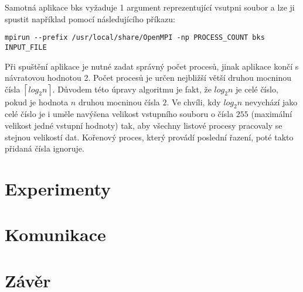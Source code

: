 \documentclass[11pt,a4paper,titlepage]{article}
\begin{document}
        Samotná aplikace bks vyžaduje 1 argument reprezentující vsutpni soubor a lze ji spustit například pomocí následujícího příkazu:
\begin{verbatim}
mpirun --prefix /usr/local/share/OpenMPI -np PROCESS_COUNT bks INPUT_FILE
\end{verbatim}
        Při spuštění aplikace je nutné zadat správný počet procesů, jinak aplikace končí s návratovou hodnotou 2.
        Počet procesů je určen nejbližší větší druhou mocninou čísla $\left \lceil{log_2 n}\right \rceil$.
        Důvodem této úpravy algoritmu je fakt, že $log_2 n$ je celé číslo, pokud je hodnota $n$ druhou
        mocninou čísla $2$. Ve chvíli, kdy $log_2 n$ nevychází jako celé číslo je i uměle navýšena velikost vstupního
        souboru o čísla $255$ (maximální velikost jedné vstupní hodnoty) tak, aby všechny listové procesy pracovaly se stejnou
        velikostí dat. Kořenový proces, který provádí poslední řazení, poté takto přidaná čísla ignoruje.

	\section{Experimenty}

	\section{Komunikace}

	\section{Závěr}
\end{document}
